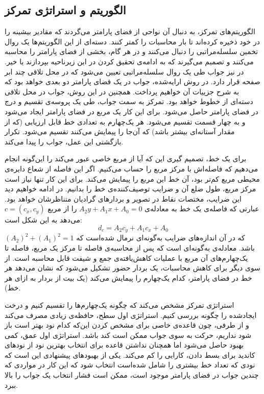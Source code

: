 \documentclass[12pt,a4paper]{article}
\numberwithin{equation}{section}
\numberwithin{figure}{section}
\theoremstyle{definition}
\theoremstyle{theorem}
\theoremstyle{definition}
\begin{document}
\subsection{الگوریتم و استراتژی تمرکز}

الگوریتم‌های تمرکز، به دنبال آن نواحی از فضای پارامتر می‌گردند که مقادیر بیشینه‌ را در خود ذخیره کرده‌اند تا بار محاسبات را کمتر کنند. دسته‌ای از این الگوریتم‌ها یک روال تخمین سلسله‌مراتبی را دنبال می‌کنند و در هر گام، بخشی از فضای پارامتر را محاسبه می‌کنند و تصمیم می‌گیرند که به ادامه‌ی تحقیق کردن در این زیرناحیه بپردازند یا خیر. در  نیز جواب طی یک روال سلسله‌مراتبی تعیین می‌شود که در محل تلاقی چند ابر صفحه قرار دارد. در روش ارایه‌شده، جواب در یک فضای پارامتر دو بعدی خواهد بود که به شرح جزییات آن خواهیم پرداخت. همچنین در این روش، جواب در محل تلاقی دسته‌ای از خطوط خواهد بود. تمرکز به سمت جواب، طی یک پروسه‌ی تقسیم و درج در فضای پارامتر حاصل می‌شود. برای این کار یک مربع در فضای پارامتر ایجاد می‌شود و به چهار قسمت تقسیم می‌شود. هر یک‌چهارم به تعدادی خط قابل ارزیابی (که از مقدار آستانه‌ای بیشتر باشد) که آن‌جا را پیمایش می‌کنند تقسیم می‌شود. تکرار بازگشتی این عمل، جواب را پیدا می‌کند. 

برای یک خط، تصمیم گیری این که آیا از مربع خاصی عبور می‌کند را این‌گونه انجام می‌دهیم که فاصله‌اش با مرکز مربع را حساب می‌کنیم. اگر این فاصله از شعاع دایره‌ی محیطی مربع کم‌تر بود، آن خط این مربع را پیمایش می‌کند. برای این کار تنها نیاز است مرکز مربع، طول ضلع آن و ضرایب توصیف‌کننده‌ی خط را بدانیم. در ادامه خواهیم دید این ضرایب، مختصات نقاط در تصویر و بردارهای گرادیان متناظرشان خواهد بود. عبارتی که فاصله‌ی یک خط به معادله‌ی 
\( A_{2}y + A_{1}x + A_{0} = 0 \)
را از مربع 
\( c= (c_x , c_y) \)
می‌دهد به این شکل است: 
\begin{equation}
\label{eq:focus}
d_c = A_{2}c_y + A_1 c_x + A_0
\end{equation}
که در آن اندازه‌های ضرایب به‌گونه‌ای نرمال شده‌است که 
\( (A_2)^2 + (A_1)^2 = 1 \) 
باشد. معادله‌ی  به‌گونه‌ای است که پس از محاسبه‌ی فاصله تا مرکز یک مربع، فاصله تا یک‌چهارم‌های آن مربع با عملیات کاهش‌یافته‌ی جمع و شیفت قابل محاسبه‌ است. از سوی دیگر برای کاهش محاسبات، یک بردار حضور تشکیل می‌شود که نشان می‌دهد هر خط در فضای پارامتر، کدام یک‌چهارم را پیمایش می‌کند (یک بیت از بردار به ازای هر خط).

استراتژی تمرکز مشخص می‌کند که چگونه یک‌چهارم‌ها را تقسیم کنیم و درخت ایجادشده را چگونه بررسی کنیم. استراتژی اول سطح، حافظه‌ی زیادی مصرف می‌کند و از طرفی، چون قاعده‌ی خاصی برای مشخص کردن این‌که کدام نود بهتر است باز شود نداریم، حرکت به سوی جواب ممکن است کند باشد. استراتژی اول عمق، کمی بهبود حاصل می‌شود اما همچنان نداشتن قاعده برای انتخاب بهترین نود از نودهای کاندید برای بسط دادن، کارایی را کم می‌کند. یکی از بهبودهای پیشنهادی این است که نودی که تعداد خط بیشتری را شامل شده‌است انتخاب شود که این کار در مواردی که چندین جواب در فضای پارامتر موجود است، ممکن است فشار انتخاب یک جواب را بالا ببرد. 
\end{document}
